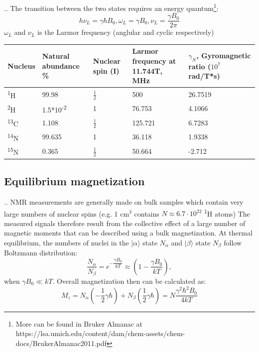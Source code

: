 \documentclass{beamer}
\begin{document}
\begin{frame}{\thesection.\thesubsection. \insertsubsection}
 The transition between the two states requires an energy quantum\footnote{More can be found in Bruker Almanac at https://lsa.umich.edu/content/dam/chem-assets/chem-docs/BrukerAlmanac2011.pdf}:
		\begin{equation}
			h \nu_L = \gamma \hbar B_0, \omega_L = \gamma B_0, \nu_L = \dfrac{\gamma B_0}{2 \pi}
		\end{equation}
		$\omega_L$ and $\nu_L$ is the Larmor frequency (anglular and cyclic respectively)

		
\begin{table}[ht]
	\centering
	\begin{tabular}{  C{1.0cm}  C{2.5cm}  C{1.0cm}  C{2.0cm}  C{2.0cm}}
		\hline\hline
		Nucleus & Natural abundance \% & Nuclear spin (I) & Larmor frequency at 11.744T, MHz & $\gamma_N$, Gyromagnetic ratio ($10^7$ rad/T*s) \\
		\hline
		\textsuperscript{1}H & 99.98 & $\frac{1}{2}$ & 500 & 26.7519 \\
		\textsuperscript{2}H & 1.5*10\textsuperscript{-2} & 1 & 76.753 & 4.1066 \\
		\textsuperscript{13}C & 1.108 & $\frac{1}{2}$ & 125.721 & 6.7283 \\
		\textsuperscript{14}N & 99.635 & 1 & 36.118 & 1.9338 \\
		\textsuperscript{15}N & 0.365 &  $\frac{1}{2}$ & 50.664 & -2.712 \\
		\hline
	\end{tabular}
\end{table}

\end{frame}

\subsection{Equilibrium magnetization}
\begin{frame}{\thesection.\thesubsection. \insertsubsection}
  NMR measurements are generally made on bulk samples which contain very large numbers of nuclear spins (e.g. 1 cm$^3$ contains $N \approx 6.7 \cdot 10^{22}$ \textsuperscript{1}H atoms)
  The measured signals therefore result from the collective effect of a large number of magnetic moments that can be described using a bulk magnetization.
  At thermal equilibrium, the numbers of nuclei in the $\vert \alpha \rangle$ state $N_{\alpha}$ and  $\vert \beta \rangle$ state $N_{\beta}$ follow Boltzmann distribution:
  \begin{equation}
    \dfrac{N_{\alpha}}{N_{\beta}} = e^{-\dfrac{\gamma B_0}{kT}} \approx (1 - \dfrac{\gamma B_0}{kT}),
  \end{equation} 
  when $\gamma B_0 \ll kT$.  Overall magnetization then can be calculated as:
  \begin{equation}
    M_z = N_{\alpha}(-\dfrac{1}{2}\gamma \hbar) + N_{\beta}(\dfrac{1}{2}\gamma \hbar) = N \dfrac{\gamma^2 \hbar^2 B_0}{4kT} 
  \end{equation}
\end{frame}
\end{document}
